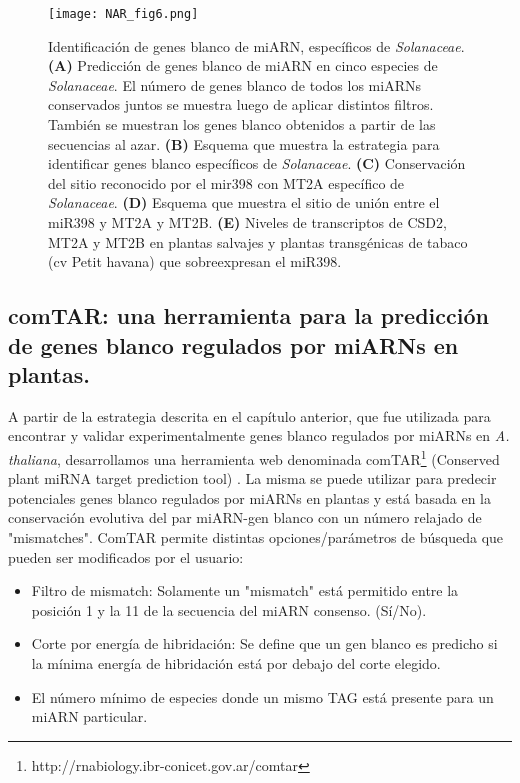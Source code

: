 \begin{figure}[htbp!] 
    \centering    
    \texttt{[image: NAR\_fig6.png]}
    \caption[Identificación de genes blanco de miARN, específicos de \textit{Solanaceae}]{Identificación de genes blanco de miARN, específicos de \textit{Solanaceae}.
    \textbf{(A)} Predicción de genes blanco de miARN en cinco especies de \textit{Solanaceae}.
    El número de genes blanco de todos los miARNs conservados juntos se muestra luego de aplicar distintos filtros.
    También se muestran los genes blanco obtenidos a partir de las secuencias al azar.
    \textbf{(B)} Esquema que muestra la estrategia para identificar genes blanco específicos de \textit{Solanaceae}.
    \textbf{(C)} Conservación del sitio reconocido por el mir398 con MT2A específico de \textit{Solanaceae}.
    \textbf{(D)} Esquema que muestra el sitio de unión entre el miR398 y MT2A y MT2B.
    \textbf{(E)} Niveles de transcriptos de CSD2, MT2A y MT2B en plantas salvajes y plantas transgénicas de tabaco (cv Petit havana) que sobreexpresan el miR398.  }
    \label{fig:NAR_fig6}
\end{figure}


\subsection{comTAR: una herramienta para la predicción de genes blanco regulados por miARNs en plantas.} 

A partir de la estrategia descrita en el capítulo anterior, que fue utilizada para encontrar y validar experimentalmente genes blanco regulados por miARNs en \textit{A. thaliana}, desarrollamos una herramienta web denominada comTAR\footnote{http://rnabiology.ibr-conicet.gov.ar/comtar} (Conserved plant miRNA target prediction tool) \citep{Chorostecki2014}.
La misma se puede utilizar para predecir potenciales genes blanco regulados por miARNs en plantas y está basada en la conservación evolutiva del par miARN-gen blanco con un número relajado de "mismatches".
ComTAR permite distintas opciones/parámetros de búsqueda que pueden ser modificados por el usuario:

\begin{itemize}
    \item Filtro de mismatch: Solamente un "mismatch" está permitido entre la posición 1 y la 11 de la secuencia del miARN consenso. (Sí/No).
    \item Corte por energía de hibridación: Se define que un gen blanco es predicho si la mínima energía de hibridación está por debajo del corte elegido.
    \item El número mínimo de especies donde un mismo TAG está presente para un miARN particular.
\end{itemize}

